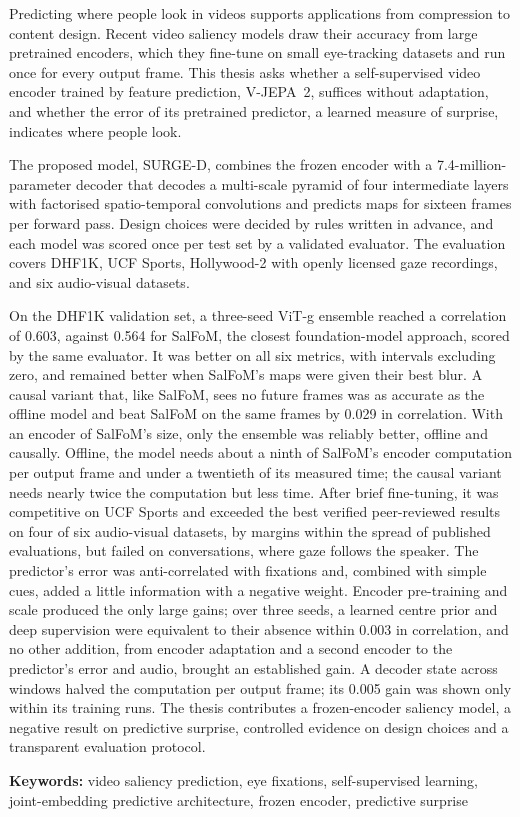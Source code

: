 

Predicting where people look in videos supports applications from compression
to content design. Recent video saliency models draw their accuracy from large
pretrained encoders, which they fine-tune on small eye-tracking datasets and run
once for every output frame. This thesis asks whether a self-supervised video
encoder trained by feature prediction, \acrshort{V-JEPA}~2, suffices without adaptation,
and whether the error of its pretrained predictor, a learned measure of
surprise, indicates where people look.

The proposed model, SURGE-D, combines the frozen encoder with a
7.4-million-parameter decoder that decodes a multi-scale pyramid of four
intermediate layers with factorised spatio-temporal convolutions and predicts
maps for sixteen frames per forward pass. Design choices were decided
by rules written in advance, and each model was scored once per test set by a
validated evaluator. The evaluation covers DHF1K, UCF Sports, Hollywood-2 with openly
licensed gaze recordings, and six audio-visual datasets.

On the DHF1K validation set, a three-seed \acrshort{ViT}-g ensemble reached
a correlation of 0.603, against 0.564 for SalFoM, the closest
foundation-model approach, scored by the same evaluator. It was better on all
six metrics, with intervals excluding zero, and remained better
when SalFoM's maps were given their best blur. A causal variant
that, like SalFoM, sees no future frames was as accurate as the offline model
and beat SalFoM on the same frames by 0.029 in correlation. With an encoder of
SalFoM's size, only the ensemble was reliably better, offline and causally.
Offline, the model needs about a ninth of SalFoM's encoder computation per
output frame and under a twentieth of its measured time; the causal
variant needs nearly twice the computation but less time. After brief
fine-tuning, it was competitive on UCF Sports and exceeded the best verified
peer-reviewed results on four of six audio-visual datasets, by margins within
the spread of published evaluations, but failed on conversations, where gaze
follows the speaker. The predictor's error was anti-correlated with fixations
and, combined with simple cues, added a little information with a negative
weight. Encoder pre-training and scale produced
the only large gains; over three seeds, a learned centre prior and deep
supervision were equivalent to their absence within 0.003 in correlation, and
no other addition, from encoder adaptation and a second encoder to the
predictor's error and audio, brought an established gain. A decoder state
across windows halved the computation per output frame; its 0.005 gain was
shown only within its training runs. The thesis contributes a frozen-encoder
saliency model, a
negative result on predictive surprise, controlled evidence on design choices
and a transparent evaluation protocol.

\medskip
\noindent\textbf{Keywords:} video saliency prediction, eye fixations,
self-supervised learning, joint-embedding predictive architecture, frozen
encoder, predictive surprise
